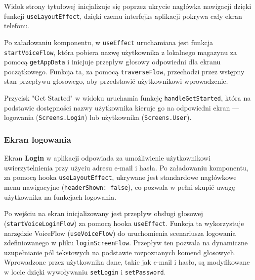 Widok strony tytułowej inicjalizuje się poprzez ukrycie nagłówka nawigacji dzięki funkcji \texttt{useLayoutEffect}, dzięki czemu interfejks aplikacji pokrywa cały ekran telefonu. 

Po załadowaniu komponentu, w \texttt{useEffect} uruchamiana jest funkcja \texttt{startVoiceFlow}, która pobiera nazwę użytkownika z lokalnego magazynu za pomocą \texttt{getAppData} i inicjuje przepływ głosowy odpowiedni dla ekranu początkowego. Funkcja ta, za pomocą \texttt{traverseFlow}, przechodzi przez wstępny stan przepływu głosowego, aby przedstawić użytkownikowi wprowadzenie. 

Przycisk "Get Started" w widoku uruchamia funkcję \texttt{handleGetStarted}, która na podstawie dostępności nazwy użytkownika kieruje go na odpowiedni ekran — logowania (\texttt{Screens.Login}) lub użytkownika (\texttt{Screens.User}).

\subsubsection{Ekran logowania}

Ekran \textbf{Login} w aplikacji odpowiada za umożliwienie użytkownikowi uwierzytelnienia przy użyciu adresu e-mail i hasła. Po załadowaniu komponentu, za pomocą hooka \texttt{useLayoutEffect}, ukrywane jest standardowe nagłówkowe menu nawigacyjne (\texttt{headerShown: false}), co pozwala w pełni skupić uwagę użytkownika na funkcjach logowania.

Po wejściu na ekran inicjalizowany jest przepływ obsługi głosowej (\texttt{startVoiceLoginFlow}) za pomocą hooka \texttt{useEffect}. Funkcja ta wykorzystuje narzędzie VoiceFlow (\texttt{useVoiceFlow}) do uruchomienia scenariusza logowania zdefiniowanego w pliku \texttt{loginScreenFlow}. Przepływ ten pozwala na dynamiczne uzupełnianie pól tekstowych na podstawie rozpoznanych komend głosowych. Wprowadzone przez użytkownika dane, takie jak e-mail i hasło, są modyfikowane w locie dzięki wywoływaniu \texttt{setLogin} i \texttt{setPassword}.

